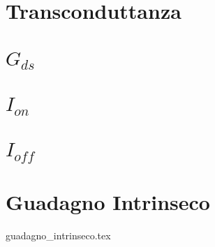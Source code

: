 \documentclass[
	a4paper,
	cleardoublepage=empty,
	headings=twolinechapter,
	numbers=autoenddot,
]{scrbook}
\begin{document}
\section[$G_{m}$]{Transconduttanza}

\section[$G_{ds}$]{$G_{ds}$}

\section[$I_{on}$]{$I_{on}$}
\section[$I_{off}$]{$I_{off}$}
\section[Guadagno Intrinseco]{Guadagno Intrinseco}
{guadagno_intrinseco.tex}

\backmatter



\end{document}
